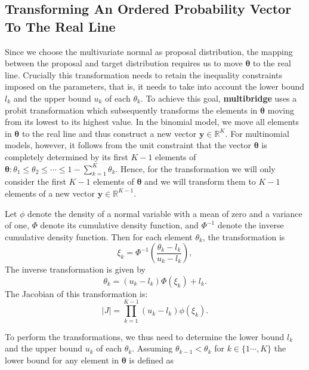 \clearpage
\makeatletter
\efloat@restorefloats
\makeatother


\begin{appendix}
\hypertarget{transforming-an-ordered-probability-vector-to-the-real-line}{%
\section{Transforming An Ordered Probability Vector To The Real
Line}\label{transforming-an-ordered-probability-vector-to-the-real-line}}

Since we choose the multivariate normal as proposal distribution, the
mapping between the proposal and target distribution requires us to move
\(\boldsymbol{\theta}\) to the real line. Crucially this transformation
needs to retain the inequality constraints imposed on the parameters,
that is, it needs to take into account the lower bound \(l_k\) and the
upper bound \(u_k\) of each \(\theta_k\). To achieve this goal,
\textbf{multibridge} uses a probit transformation which subsequently
transforms the elements in \(\boldsymbol{\theta}\) moving from its
lowest to its highest value. In the binomial model, we move all elements
in \(\boldsymbol{\theta}\) to the real line and thus construct a new
vector \(\boldsymbol{y} \in \mathbb{R}^{K}\). For multinomial models,
however, it follows from the unit constraint that the vector
\(\boldsymbol{\theta}\) is completely determined by its first \(K - 1\)
elements of
\(\boldsymbol{\theta}: \theta_1 \leq \theta_2 \leq \cdots \leq 1 - \sum_{k = 1}^K \theta_k\).
Hence, for the transformation we will only consider the first \(K - 1\)
elements of \(\boldsymbol{\theta}\) and we will transform them to
\(K - 1\) elements of a new vector
\(\boldsymbol{y} \in \mathbb{R}^{K - 1}\).

Let \(\phi\) denote the density of a normal variable with a mean of zero
and a variance of one, \(\Phi\) denote its cumulative density function,
and \(\Phi^{-1}\) denote the inverse cumulative density function. Then
for each element \(\theta_k\), the transformation is
\[\xi_k = \Phi^{-1}\left(\frac{\theta_k - l_k}{u_k - l_k}\right),\] The
inverse transformation is given by
\[\theta_k = (u_k - l_k) \Phi(\xi_k) + l_k.\] The Jacobian of this
transformation is:
\[\left|J\right| = \prod_{k = 1}^{K - 1}  \left(u_k - l_k \right) \phi(\xi_k).\]

To perform the transformations, we thus need to determine the lower
bound \(l_k\) and the upper bound \(u_k\) of each \(\theta_k\). Assuming
\(\theta_{k-1} < \theta_{k}\) for \(k \in \{1 \cdots, K\}\) the lower
bound for any element in \(\boldsymbol{\theta}\) is defined as


\end{appendix}

